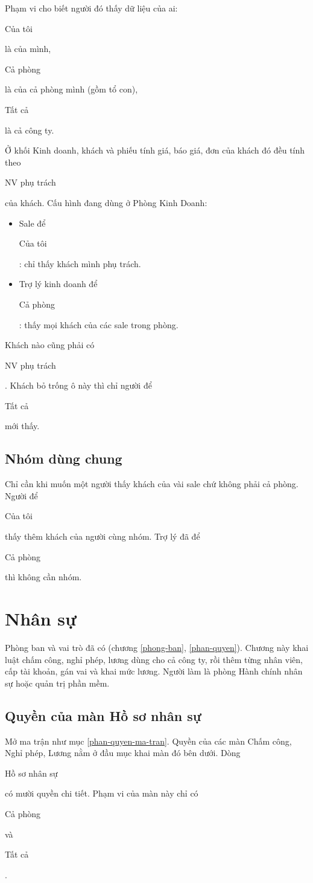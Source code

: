 \documentclass[11pt,a4paper]{article}
\newcommand{\oo}[1]{{\setlength{\fboxsep}{1.2pt}\colorbox{vang}{\strut #1}}}
\begin{document}
\begin{boicanh}
Phạm vi cho biết người đó thấy dữ liệu của ai: \oo{Của tôi} là của mình, \oo{Cả phòng} là của cả phòng mình
(gồm tổ con), \oo{Tất cả} là cả công ty.
\end{boicanh}

Ở khối Kinh doanh, khách và phiếu tính giá, báo giá, đơn của khách đó đều tính theo \oo{NV phụ trách} của
khách. Cấu hình đang dùng ở Phòng Kinh Doanh:

\begin{itemize}
\item Sale để \oo{Của tôi}: chỉ thấy khách mình phụ trách.
\item Trợ lý kinh doanh để \oo{Cả phòng}: thấy mọi khách của các sale trong phòng.
\end{itemize}

Khách nào cũng phải có \oo{NV phụ trách}. Khách bỏ trống ô này thì chỉ người để \oo{Tất cả} mới thấy.

\subsection{Nhóm dùng chung}\label{phan-quyen-nhom}

Chỉ cần khi muốn một người thấy khách của vài sale chứ không phải cả phòng. Người để \oo{Của tôi} thấy thêm
khách của người cùng nhóm. Trợ lý đã để \oo{Cả phòng} thì không cần nhóm.

\section{Nhân sự}\label{nhan-su}

\begin{boicanh}
Phòng ban và vai trò đã có (chương \ref{phong-ban}, \ref{phan-quyen}). Chương này khai luật chấm công, nghỉ
phép, lương dùng cho cả công ty, rồi thêm từng nhân viên, cấp tài khoản, gán vai và khai mức lương. Người làm là
phòng Hành chính nhân sự hoặc quản trị phần mềm.
\end{boicanh}

\subsection{Quyền của màn Hồ sơ nhân sự}\label{nhan-su-quyen}

Mở ma trận như mục \ref{phan-quyen-ma-tran}. Quyền của các màn Chấm công, Nghỉ phép, Lương nằm ở đầu mục khai
màn đó bên dưới. Dòng \oo{Hồ sơ nhân sự} có mười quyền chi tiết. Phạm vi của màn này chỉ có \oo{Cả phòng} và \oo{Tất cả}.
\end{document}
